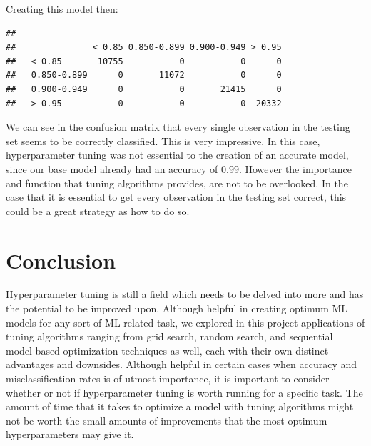 \documentclass[12pt]{article}
\newenvironment{Shaded}{\begin{snugshade}}{\end{snugshade}}
\newcommand{\CommentTok}[1]{\textcolor[rgb]{0.56,0.35,0.01}{\textit{#1}}}
\newcommand{\DataTypeTok}[1]{\textcolor[rgb]{0.13,0.29,0.53}{#1}}
\newcommand{\DecValTok}[1]{\textcolor[rgb]{0.00,0.00,0.81}{#1}}
\newcommand{\FloatTok}[1]{\textcolor[rgb]{0.00,0.00,0.81}{#1}}
\newcommand{\KeywordTok}[1]{\textcolor[rgb]{0.13,0.29,0.53}{\textbf{#1}}}
\newcommand{\NormalTok}[1]{#1}
\newcommand{\OperatorTok}[1]{\textcolor[rgb]{0.81,0.36,0.00}{\textbf{#1}}}
\newcommand{\StringTok}[1]{\textcolor[rgb]{0.31,0.60,0.02}{#1}}
\begin{document}
Creating this model then:

\begin{Shaded}
\end{Shaded}

\begin{verbatim}
##              
##               < 0.85 0.850-0.899 0.900-0.949 > 0.95
##   < 0.85       10755           0           0      0
##   0.850-0.899      0       11072           0      0
##   0.900-0.949      0           0       21415      0
##   > 0.95           0           0           0  20332
\end{verbatim}

We can see in the confusion matrix that every single observation in the
testing set seems to be correctly classified. This is very impressive.
In this case, hyperparameter tuning was not essential to the creation of
an accurate model, since our base model already had an accuracy of 0.99.
However the importance and function that tuning algorithms provides, are
not to be overlooked. In the case that it is essential to get every
observation in the testing set correct, this could be a great strategy
as how to do so.

\newpage

\hypertarget{conclusion}{%
\section{Conclusion}\label{conclusion}}

\label{sec:conclusion}

Hyperparameter tuning is still a field which needs to be delved into
more and has the potential to be improved upon. Although helpful in
creating optimum ML models for any sort of ML-related task, we explored
in this project applications of tuning algorithms ranging from grid
search, random search, and sequential model-based optimization
techniques as well, each with their own distinct advantages and
downsides. Although helpful in certain cases when accuracy and
misclassification rates is of utmost importance, it is important to
consider whether or not if hyperparameter tuning is worth running for a
specific task. The amount of time that it takes to optimize a model with
tuning algorithms might not be worth the small amounts of improvements
that the most optimum hyperparameters may give it.
\end{document}
